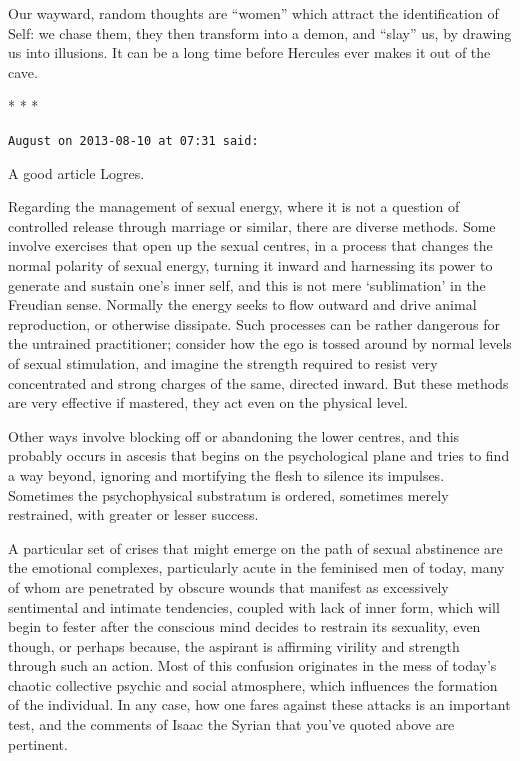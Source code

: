 Our wayward, random thoughts are ``women'' which attract the identification of Self: we chase them, they then transform into a demon, and ``slay'' us, by drawing us into illusions. It can be a long time before Hercules ever makes it out of the cave.



\begin{center}* * *\end{center}

\begin{footnotesize}
\begin{sffamily}
\texttt{August on 2013-08-10 at 07:31 said:}

A good article Logres.

Regarding the management of sexual energy, where it is not a question of controlled release through marriage or similar, there are diverse methods. Some involve exercises that open up the sexual centres, in a process that changes the normal polarity of sexual energy, turning it inward and harnessing its power to generate and sustain one's inner self, and this is not mere `sublimation' in the Freudian sense. Normally the energy seeks to flow outward and drive animal reproduction, or otherwise dissipate. Such processes can be rather dangerous for the untrained practitioner; consider how the ego is tossed around by normal levels of sexual stimulation, and imagine the strength required to resist very concentrated and strong charges of the same, directed inward. But these methods are very effective if mastered, they act even on the physical level.

Other ways involve blocking off or abandoning the lower centres, and this probably occurs in ascesis that begins on the psychological plane and tries to find a way beyond, ignoring and mortifying the flesh to silence its impulses. Sometimes the psychophysical substratum is ordered, sometimes merely restrained, with greater or lesser success.

A particular set of crises that might emerge on the path of sexual abstinence are the emotional complexes, particularly acute in the feminised men of today, many of whom are penetrated by obscure wounds that manifest as excessively sentimental and intimate tendencies, coupled with lack of inner form, which will begin to fester after the conscious mind decides to restrain its sexuality, even though, or perhaps because, the aspirant is affirming virility and strength through such an action. Most of this confusion originates in the mess of today's chaotic collective psychic and social atmosphere, which influences the formation of the individual. In any case, how one fares against these attacks is an important test, and the comments of Isaac the Syrian that you've quoted above are pertinent.


\end{sffamily}
\end{footnotesize}
